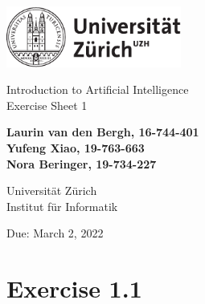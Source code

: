\documentclass[12pt]{article}
\begin{document}
\begin{titlepage}
\includegraphics[height=20mm]{images/uzh_logo}\\

\begin{flushleft}

\vspace{2cm}

{\Large Introduction to Artificial Intelligence\\Exercise Sheet 1}\\

\vspace{4cm}

\textbf{Laurin van den Bergh, 16-744-401\\Yufeng Xiao, 19-763-663\\Nora Beringer, 19-734-227}\\

\vspace{2cm}

Universität Zürich\\
Institut für Informatik

\vfill Due: March 2, 2022

\vspace{3cm}


\end{flushleft}
\end{titlepage}

\newpage

\section*{Exercise 1.1}
\end{document}
